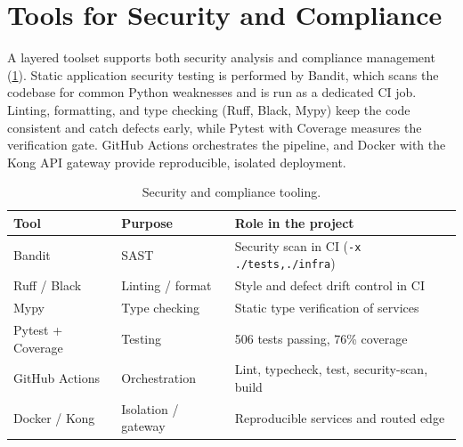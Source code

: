 \documentclass[10pt,journal,onecolumn]{IEEEtran}
\begin{document}
\section{Tools for Security and Compliance}
A layered toolset supports both security analysis and compliance
management (\cref{tab:tools}). Static application security testing is
performed by Bandit, which scans the codebase for common Python
weaknesses and is run as a dedicated CI job. Linting, formatting, and
type checking (Ruff, Black, Mypy) keep the code consistent and catch
defects early, while Pytest with Coverage measures the verification
gate. GitHub Actions orchestrates the pipeline, and Docker with the Kong
API gateway provide reproducible, isolated deployment.

\begin{table}[htbp]
  \centering
  \footnotesize
  \begin{tabular}{@{}p{}p{}p{}@{}}
    \toprule
    \textbf{Tool} & \textbf{Purpose} & \textbf{Role in the project}\\
    \midrule
    Bandit & SAST & Security scan in CI (\texttt{-x ./tests,./infra})\\
    Ruff / Black & Linting / format & Style and defect drift control in CI\\
    Mypy & Type checking & Static type verification of services\\
    Pytest + Coverage & Testing & 506 tests passing, 76\% coverage\\
    GitHub Actions & Orchestration & Lint, typecheck, test, security-scan, build\\
    Docker / Kong & Isolation / gateway & Reproducible services and routed edge\\
    \bottomrule
  \end{tabular}
  \caption{Security and compliance tooling.}\label{tab:tools}
\end{table}

\end{document}
